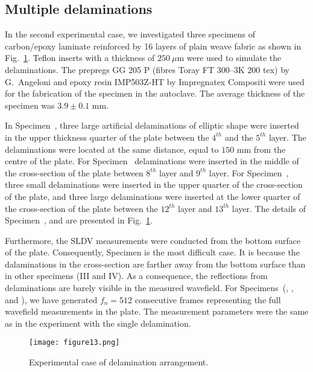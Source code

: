 \begin{sloppypar}
	\subsection{Multiple delaminations}
	In the second experimental case, we investigated three specimens of carbon/epoxy laminate reinforced by 16 layers of plain weave fabric as shown in Fig.~\ref{fig:plate_delam_arrangment}. 
	Teflon inserts with a thickness of \(250\ \mu\)m were used to simulate the delaminations.
	The prepregs GG 205 P (fibres Toray FT 300–3K 200 tex) by G.~Angeloni and epoxy resin IMP503Z‐HT by Impregnatex Compositi were used for the fabrication of the specimen in the autoclave. 
	The average thickness of the specimen was \(3.9 \pm 0.1\) mm.
	
	In Specimen~, three large artificial delaminations of elliptic shape were inserted in the upper thickness quarter of the plate between the \(4^{th}\) and the \(5^{th}\) layer.
	The delaminations were located at the same distance, equal to \(150\) mm from the centre of the plate.
	For Specimen~ delaminations were inserted in the middle of the cross-section of the plate between \(8^{th}\) layer and \(9^{th}\) layer.
	For Specimen~, three small delaminations were inserted in the upper quarter of the cross-section of the plate, and three large delaminations were inserted at the lower quarter of the cross-section of the plate between the \(12^{th}\) layer and \(13^{th}\) layer.
	The details of Specimen~,  and  are presented in Fig.~\ref{fig:plate_delam_arrangment}.
	
	Furthermore, the SLDV measurements were conducted from the bottom surface of the plate. 
	Consequently, Specimen  is the most difficult case.
	It is because the dalaminations in the cross-section are farther away from the bottom surface than in other specimens (III and IV).
	As a consequence, the reflections from delaminations are barely visible in the measured wavefield.
	For Specimens~(, , and ),  we have generated \(f_n=512\) consecutive frames representing the full wavefield measurements in the plate.
	The measurement parameters were the same as in the experiment with the single delamination.
	\begin{figure}[!ht]
		\centering
		\texttt{[image: figure13.png]}
		\caption{Experimental case of delamination arrangement.}
		\label{fig:plate_delam_arrangment}
	\end{figure}
	

\end{sloppypar}
